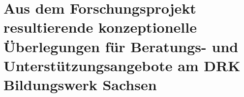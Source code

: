 \section[Konzeptionelle Überlegungen für das DRK Bildungswerk Sachsen]{Aus dem Forschungsprojekt resultierende konzeptionelle Überlegungen für Beratungs- und Unterstützungsangebote am DRK Bildungswerk Sachsen}
\label{sec:AusDemForschungsprojektResultierendeKonzeptionelleÜberlegungenFürBeratungsUndUnterstützungsangeboteAmDRKBildungswerkSachsen}